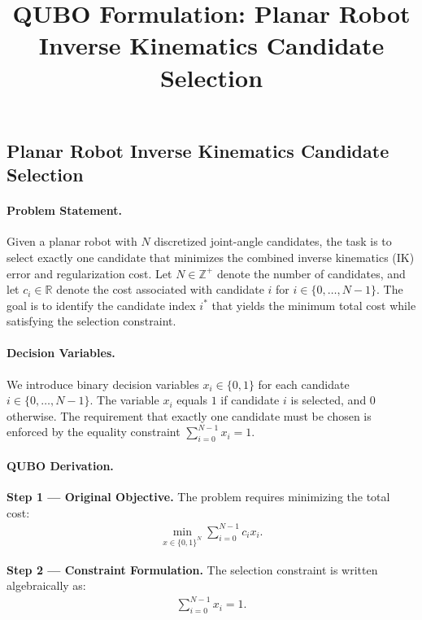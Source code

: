 \documentclass[12pt]{article}
\title{QUBO Formulation: Planar Robot Inverse Kinematics Candidate Selection}
\date{}
\begin{document}
\maketitle

\subsection*{Planar Robot Inverse Kinematics Candidate Selection}

\paragraph{Problem Statement.}
Given a planar robot with $N$ discretized joint-angle candidates, the task is to select exactly one candidate that minimizes the combined inverse kinematics (IK) error and regularization cost. Let $N \in \mathbb{Z}^+$ denote the number of candidates, and let $c_i \in \mathbb{R}$ denote the cost associated with candidate $i$ for $i \in \{0, \dots, N-1\}$. The goal is to identify the candidate index $i^*$ that yields the minimum total cost while satisfying the selection constraint.

\paragraph{Decision Variables.}
We introduce binary decision variables $x_i \in \{0, 1\}$ for each candidate $i \in \{0, \dots, N-1\}$. The variable $x_i$ equals $1$ if candidate $i$ is selected, and $0$ otherwise. The requirement that exactly one candidate must be chosen is enforced by the equality constraint $\sum_{i=0}^{N-1} x_i = 1$.

\paragraph{QUBO Derivation.}
\textbf{Step 1 --- Original Objective.} The problem requires minimizing the total cost:
\begin{align}
\min_{x \in \{0,1\}^N} \sum_{i=0}^{N-1} c_i x_i.
\end{align}

\textbf{Step 2 --- Constraint Formulation.} The selection constraint is written algebraically as:
\begin{align}
\sum_{i=0}^{N-1} x_i = 1.
\end{align}
\end{document}
